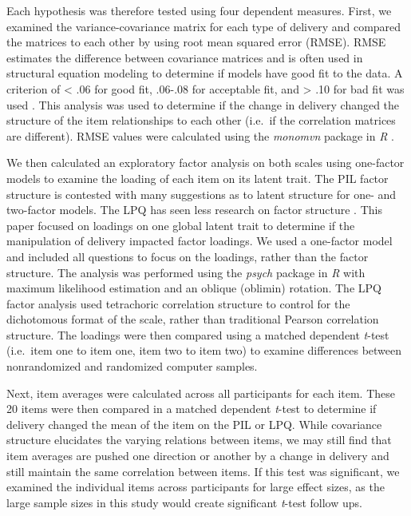 \documentclass[english,man, mask]{apa6}
\theoremstyle{definition}
\theoremstyle{definition}
\theoremstyle{definition}
\theoremstyle{remark}
\begin{document}
Each hypothesis was therefore tested using four dependent measures.
First, we examined the variance-covariance matrix for each type of
delivery and compared the matrices to each other by using root mean
squared error (RMSE). RMSE estimates the difference between covariance
matrices and is often used in structural equation modeling to determine
if models have good fit to the data. A criterion of \textless{} .06 for
good fit, .06-.08 for acceptable fit, and \textgreater{} .10 for bad fit
was used \autocite{Hu1999}. This analysis was used to determine if the
change in delivery changed the structure of the item relationships to
each other (i.e.~if the correlation matrices are different). RMSE values
were calculated using the \emph{monomvn} package in \emph{R}
\autocite{Gramacy2010}.

We then calculated an exploratory factor analysis on both scales using
one-factor models to examine the loading of each item on its latent
trait. The PIL factor structure is contested \autocite{Strack2009} with
many suggestions as to latent structure for one- and two-factor models.
The LPQ has seen less research on factor structure
\autocite{Schulenberg2004}. This paper focused on loadings on one global
latent trait to determine if the manipulation of delivery impacted
factor loadings. We used a one-factor model and included all questions
to focus on the loadings, rather than the factor structure. The analysis
was performed using the \emph{psych} package in \emph{R} with maximum
likelihood estimation and an oblique (oblimin) rotation. The LPQ factor
analysis used tetrachoric correlation structure to control for the
dichotomous format of the scale, rather than traditional Pearson
correlation structure. The loadings were then compared using a matched
dependent \emph{t}-test (i.e.~item one to item one, item two to item
two) to examine differences between nonrandomized and randomized
computer samples.

Next, item averages were calculated across all participants for each
item. These 20 items were then compared in a matched dependent
\emph{t}-test to determine if delivery changed the mean of the item on
the PIL or LPQ. While covariance structure elucidates the varying
relations between items, we may still find that item averages are pushed
one direction or another by a change in delivery and still maintain the
same correlation between items. If this test was significant, we
examined the individual items across participants for large effect
sizes, as the large sample sizes in this study would create significant
\emph{t}-test follow ups.
\end{document}
